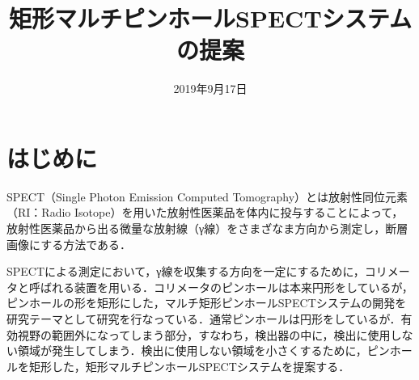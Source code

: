 \documentclass[dvipdfmx,autodetect-engine,10pt]{jsarticle}%
\title{矩形マルチピンホールSPECTシステムの提案}
\date{2019年9月17日}
\begin{document}
\maketitle
\section{はじめに}
SPECT（Single Photon Emission Computed Tomography）とは放射性同位元素（RI：Radio Isotope）を用いた放射性医薬品を体内に投与することによって，放射性医薬品から出る微量な放射線（γ線）をさまざなま方向から測定し，断層画像にする方法である．

SPECTによる測定において，γ線を収集する方向を一定にするために，コリメータと呼ばれる装置を用いる．コリメータのピンホールは本来円形をしているが，ピンホールの形を矩形にした，マルチ矩形ピンホールSPECTシステムの開発を研究テーマとして研究を行なっている．通常ピンホールは円形をしているが．有効視野の範囲外になってしまう部分，すなわち，検出器の中に，検出に使用しない領域が発生してしまう．検出に使用しない領域を小さくするために，ピンホールを矩形した，矩形マルチピンホールSPECTシステムを提案する．
\end{document}
